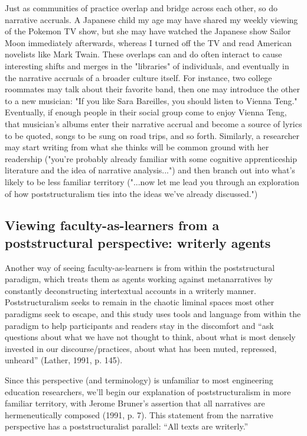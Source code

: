Just as communities of practice overlap and bridge across each other, so do narrative accruals. A Japanese child my age may have shared my weekly viewing of the Pokemon TV show, but she may have watched the Japanese show Sailor Moon immediately afterwards, whereas I turned off the TV and read American novelists like Mark Twain. These overlaps can and do often interact to cause interesting shifts and merges in the "libraries" of individuals, and eventually in the narrative accruals of a broader culture itself. For instance, two college roommates may talk about their favorite band, then one may introduce the other to a new musician: "If you like Sara Bareilles, you should listen to Vienna Teng." Eventually, if enough people in their social group come to enjoy Vienna Teng, that musician's albums enter their narrative accrual and become a source of lyrics to be quoted, songs to be sung on road trips, and so forth. Similarly, a researcher may start writing from what she thinks will be common ground with her readership ("you're probably already familiar with some cognitive apprenticeship literature and the idea of narrative analysis...") and then branch out into what's likely to be less familiar territory ("...now let me lead you through an exploration of how poststructuralism ties into the ideas we’ve already discussed.")

\subsection{Viewing faculty-as-learners from a poststructural perspective: writerly agents}

Another way of seeing faculty-as-learners is from within the poststructural paradigm, which treats them as agents working against metanarratives by constantly deconstructing intertextual accounts in a writerly manner. Poststructuralism seeks to remain in the chaotic liminal spaces most other paradigms seek to escape, and this study uses tools and language from within the paradigm to help participants and readers stay in the discomfort and “ask questions about what we have not thought to think, about what is most densely invested in our discourse/practices, about what has been muted, repressed, unheard” (Lather, 1991, p. 145).

Since this perspective (and terminology) is unfamiliar to most engineering education researchers, we’ll begin our explanation of poststructuralism in more familiar territory, with Jerome Bruner’s assertion that all narratives are hermeneutically composed (1991, p. 7). This statement from the narrative perspective has a poststructuralist parallel: “All texts are writerly.” 

